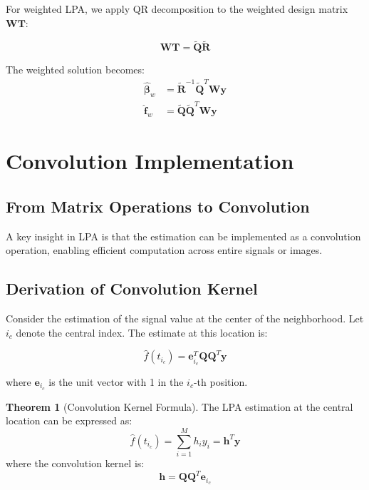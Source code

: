 \documentclass[12pt]{article}
\renewcommand{\vec}[1]{\mathbf{#1}}
\newcommand{\mat}[1]{\mathbf{#1}}
\theoremstyle{definition}
\newtheorem{theorem}{Theorem}[section]
\begin{document}
For weighted LPA, we apply QR decomposition to the weighted design matrix $\mat{W}\mat{T}$:

\begin{equation}
    \label{eq:weighted_qr}
    \mat{W}\mat{T} = \tilde{\mat{Q}}\tilde{\mat{R}}
\end{equation}

The weighted solution becomes:
\begin{align}
    \hat{\vec{\beta}}_w & = \tilde{\mat{R}}^{-1}\tilde{\mat{Q}}^T\mat{W}\vec{y} \\
    \hat{\vec{f}}_w     & = \tilde{\mat{Q}}\tilde{\mat{Q}}^T\mat{W}\vec{y}
\end{align}

\newpage

\section{Convolution Implementation}
\label{sec:convolution}

\subsection{From Matrix Operations to Convolution}
\label{subsec:matrix_to_conv}

A key insight in LPA is that the estimation can be implemented as a convolution operation, enabling efficient computation across entire signals or images.

\subsection{Derivation of Convolution Kernel}
\label{subsec:conv_derivation}

Consider the estimation of the signal value at the center of the neighborhood. Let $i_c$ denote the central index. The estimate at this location is:

\begin{equation}
    \label{eq:central_estimate}
    \hat{f}(t_{i_c}) = \vec{e}_{i_c}^T \mat{Q}\mat{Q}^T\vec{y}
\end{equation}

where $\vec{e}_{i_c}$ is the unit vector with 1 in the $i_c$-th position.

\begin{theorem}[Convolution Kernel Formula]
    \label{thm:conv_kernel}
    The LPA estimation at the central location can be expressed as:
    \begin{equation}
        \label{eq:conv_formula}
        \hat{f}(t_{i_c}) = \sum_{i=1}^{M} h_i y_i = \vec{h}^T \vec{y}
    \end{equation}
    where the convolution kernel is:
    \begin{equation}
        \label{eq:kernel_formula}
        \vec{h} = \mat{Q}\mat{Q}^T \vec{e}_{i_c}
    \end{equation}
\end{theorem}
\end{document}
